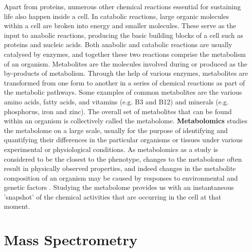 Apart from proteins, numerous other chemical reactions essential for sustaining life also happen inside a cell. In catabolic reactions, large organic molecules  within a cell are broken into energy and smaller molecules. These serve as the input to anabolic reactions, producing the basic building blocks of a cell such as proteins and nucleic acids. Both anabolic and catabolic reactions are usually catalysed by enzymes, and together these two reactions comprise the metabolism of an organism. Metabolites are the molecules involved during or produced as the by-products of metabolism. Through the help of various enzymes, metabolites are transformed from one form to another in a series of chemical reactions as part of the metabolic pathways. Some examples of common metabolites are the various amino acids, fatty acids, and vitamins (e.g. B3 and B12) and minerals (e.g. phosphorus, iron and zinc). The overall set of metabolites that can be found within an organism is collectively called the metabolome. \textbf{Metabolomics} studies the metabolome on a large scale, usually for the purpose of identifying and quantifying their differences in the particular organisms or tissues under various experimental or physiological conditions. As metabolomics as a study is considered to be the closest to the phenotype, changes to the metabolome often result in physically observed properties, and indeed changes in the metabolite composition of an organism may be caused by responses to environmental and genetic factors \cite{Katajamaa2007}. Studying the metabolome provides us with an instantaneous 'snapshot' of the chemical activities that are occurring in the cell at that moment. 

\section{Mass Spectrometry\label{sub:mass-spec}}

